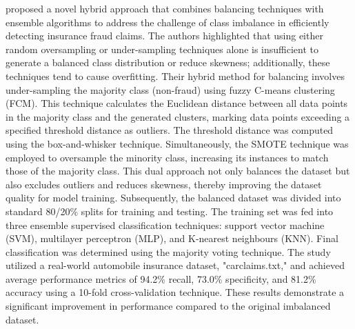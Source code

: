 \documentclass[twoside,11pt]{article}
\begin{document}
\cite{Padhi2020} proposed a novel hybrid approach that combines balancing techniques with ensemble algorithms to address the challenge of class imbalance in efficiently detecting insurance fraud claims. The authors highlighted that using either random oversampling or under-sampling techniques alone is insufficient to generate a balanced class distribution or reduce skewness; additionally, these techniques tend to cause overfitting. Their hybrid method for balancing involves under-sampling the majority class (non-fraud) using fuzzy C-means clustering (FCM). This technique calculates the Euclidean distance between all data points in the majority class and the generated clusters, marking data points exceeding a specified threshold distance as outliers. The threshold distance was computed using the box-and-whisker technique. Simultaneously, the SMOTE technique was employed to oversample the minority class, increasing its instances to match those of the majority class. This dual approach not only balances the dataset but also excludes outliers and reduces skewness, thereby improving the dataset quality for model training. Subsequently, the balanced dataset was divided into standard 80/20\% splits for training and testing. The training set was fed into three ensemble supervised classification techniques: support vector machine (SVM), multilayer perceptron (MLP), and K-nearest neighbours (KNN). Final classification was determined using the majority voting technique. The study utilized a real-world automobile insurance dataset, "carclaims.txt," and achieved average performance metrics of 94.2\% recall, 73.0\% specificity, and 81.2\% accuracy using a 10-fold cross-validation technique. These results demonstrate a significant improvement in performance compared to the original imbalanced dataset.
\end{document}
